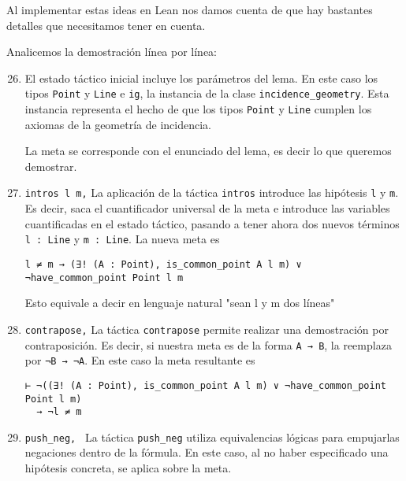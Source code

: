 Al implementar estas ideas en Lean nos damos cuenta de que hay bastantes
detalles que necesitamos tener en cuenta.


Analicemos la demostración línea por línea:
\begin{enumerate}[label=L.\arabic*, topsep=0mm]
	\setcounter{enumi}{25}

	\item El estado táctico inicial incluye los parámetros del lema. En este caso
	      los tipos \lstinline{Point} y \lstinline{Line} e \lstinline{ig}, la
	      instancia de la clase \lstinline{incidence_geometry}. Esta instancia
	      representa el hecho de que los tipos \lstinline{Point} y \lstinline{Line}
	      cumplen los axiomas de la geometría de incidencia.

	      La meta se corresponde con el enunciado del lema, es decir lo que queremos
	      demostrar.


	\item \lstinline{intros l m,} La aplicación de la táctica \lstinline{intros}
	      introduce las hipótesis \lstinline{l} y \lstinline{m}. Es decir, saca el
	      cuantificador universal de la meta e introduce las variables cuantificadas
	      en el estado táctico, pasando a tener ahora dos nuevos términos
	      \lstinline{l : Line} y \lstinline{m : Line}. La nueva meta es
	      \begin{lstlisting}
l ≠ m → (∃! (A : Point), is_common_point A l m) ∨ ¬have_common_point Point l m
\end{lstlisting}
	      Esto equivale a decir en lenguaje natural "sean l y m dos líneas"

	\item \lstinline{contrapose,} La táctica \lstinline{contrapose} permite
	      realizar una demostración por contraposición. Es decir, si nuestra meta es
	      de la forma \lstinline{A → B}, la reemplaza por \lstinline{¬B → ¬A}. En
	      este caso la meta resultante es
	      \begin{lstlisting}
⊢ ¬((∃! (A : Point), is_common_point A l m) ∨ ¬have_common_point Point l m) 
  → ¬l ≠ m
\end{lstlisting}

	\item \lstinline{push_neg, } La táctica \lstinline{push_neg} utiliza
	      equivalencias lógicas para \guillemotleft empujar\guillemotright las negaciones dentro de la fórmula.
	      En este caso, al no haber especificado una hipótesis concreta, se aplica
	      sobre la meta.


\end{enumerate}
